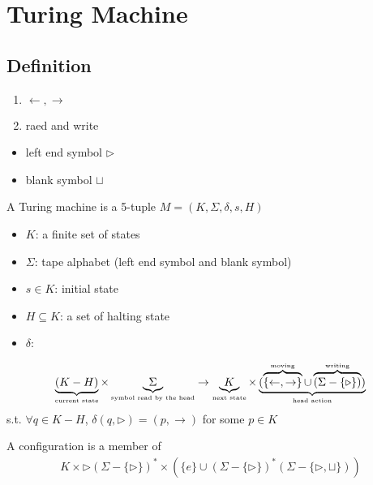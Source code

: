 \newpage
\section{Turing Machine}

\subsection{Definition}

\begin{enumerate}
    \item $\leftarrow, \rightarrow$
    \item raed and write
\end{enumerate}

\begin{itemize}
    \item left end symbol $\triangleright$
    \item blank symbol $\sqcup $
\end{itemize}

\begin{definition}
    A Turing machine is a 5-tuple $M=(K, \Sigma, \delta, s, H)$
    \begin{itemize}
        \item $K$: a finite set of states
        \item $\Sigma$: tape alphabet (left end symbol and blank symbol)
        \item $s\in K$: initial state
        \item $H\subseteq K$: a set of halting state
        \item $\delta$: 
    \end{itemize}
    \begin{align*}
        \underbrace{(K-H)}_{\text{\tiny current state}} \times \underbrace{\Sigma}_{\text{\tiny symbol read by the head}} \to \underbrace{K}_{\text{\tiny next state}} \times \underbrace{(\overbrace{\{ \leftarrow, \rightarrow \}}^{\text{\tiny moving}}\cup \overbrace{(\Sigma -\{ \triangleright  \})}^{\text{\tiny writing}})}_{\text{\tiny head action}}
    \end{align*}
    s.t. $\forall q\in K-H$, $\delta(q,\triangleright)=(p, \rightarrow)$ for some $p\in K$
\end{definition}

\begin{definition}[configuration]
    A configuration is a member of 
    \begin{align*}
        K \times \triangleright (\Sigma -\{ \triangleright \})^*\times \left(\{ e \}\cup (\Sigma -\{ \triangleright \})^*(\Sigma -\{ \triangleright, \sqcup\})\right)
    \end{align*}
\end{definition}

